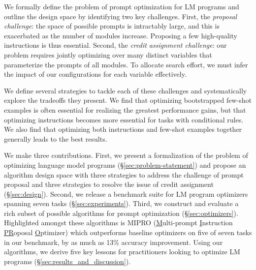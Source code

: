 We formally define the problem of prompt optimization for LM programs and outline the design space by identifying two key challenges. First, the \emph{proposal challenge}: the space of possible prompts is intractably large, and this is exacerbated as the number of modules increase.  Proposing a few high-quality instructions is thus essential. Second, the \emph{credit assignment challenge}: our problem requires jointly optimizing over many distinct variables that parameterize the prompts of all modules. To allocate search effort, we must infer the impact of our configurations for each variable effectively.

We define several strategies to tackle each of these challenges and systematically explore the tradeoffs they present. We find that optimizing bootstrapped few-shot examples is often essential for realizing the greatest performance gains, but that optimizing instructions becomes more essential for tasks with conditional rules. We also find that optimizing both instructions and few-shot examples together generally leads to the best results.

We make three contributions. First, we present a formalization of the problem of optimizing language model programs (\S \ref{sec:problem-statement}) and propose an algorithm design space with three strategies to address the challenge of prompt proposal and three strategies to resolve the issue of credit assignment (\S \ref{sec:design}). Second, we release a benchmark suite for LM program optimizers spanning seven tasks (\S\ref{sec:experiments}). Third, we construct and evaluate a rich subset of possible algorithms for prompt optimization (\S \ref{sec:optimizers}).  Highlighted amongst these algorithms is MIPRO (\underline{M}ulti-prompt \underline{I}nstruction \underline{PR}oposal \underline{O}ptimizer) which outperforms  baseline optimizers on five of seven tasks in our benchmark, by as much as 13\% accuracy improvement.  Using our algorithms, we derive five key lessons for practitioners looking to optimize LM programs (\S \ref{sec:results_and_discussion}).

    





























